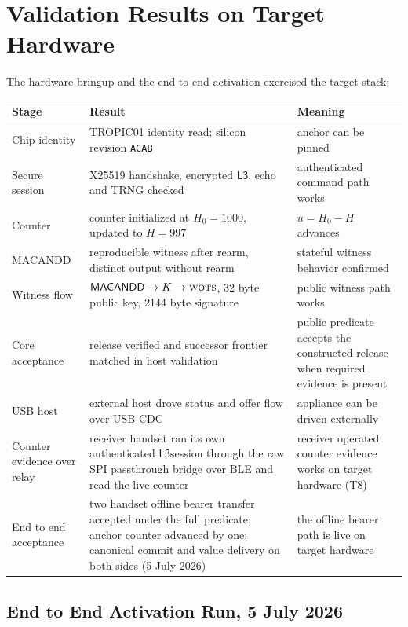 \documentclass[11pt]{article}
\theoremstyle{definition}
\theoremstyle{remark}
\newcommand{\MACD}{\ensuremath{\mathsf{MACANDD}}}
\newcommand{\WOTS}{\textsc{wots}}
\newcommand{\Lthree}{\ensuremath{\mathsf{L3}}}
\begin{document}
\section{Validation Results on Target Hardware}

The hardware bringup and the end to end activation exercised the target stack:

\begin{center}
\begin{tabular}{lll}
\toprule
\textbf{Stage} & \textbf{Result} & \textbf{Meaning}\\
\midrule
Chip identity &
TROPIC01 identity read; silicon revision \texttt{ACAB} &
anchor can be pinned\\
Secure session &
X25519 handshake, encrypted \Lthree, echo and TRNG checked &
authenticated command path works\\
Counter &
counter initialized at \(H_0=1000\), updated to \(H=997\) &
\(u=H_0-H\) advances\\
MACANDD &
reproducible witness after rearm, distinct output without rearm &
stateful witness behavior confirmed\\
Witness flow &
\(\MACD\rightarrow K\rightarrow\WOTS\), 32 byte public key, 2144 byte signature &
public witness path works\\
Core acceptance &
release verified and successor frontier matched in host validation &
public predicate accepts the constructed release when required evidence is present\\
USB host &
external host drove status and offer flow over USB CDC &
appliance can be driven externally\\
Counter evidence over relay &
receiver handset ran its own authenticated \Lthree session through the raw SPI passthrough
bridge over BLE and read the live counter &
receiver operated counter evidence works on target hardware (T8)\\
End to end acceptance &
two handset offline bearer transfer accepted under the full predicate; anchor counter advanced by
one; canonical commit and value delivery on both sides (5 July 2026) &
the offline bearer path is live on target hardware\\
\bottomrule
\end{tabular}
\end{center}

\subsection{End to End Activation Run, 5 July 2026}
\end{document}
